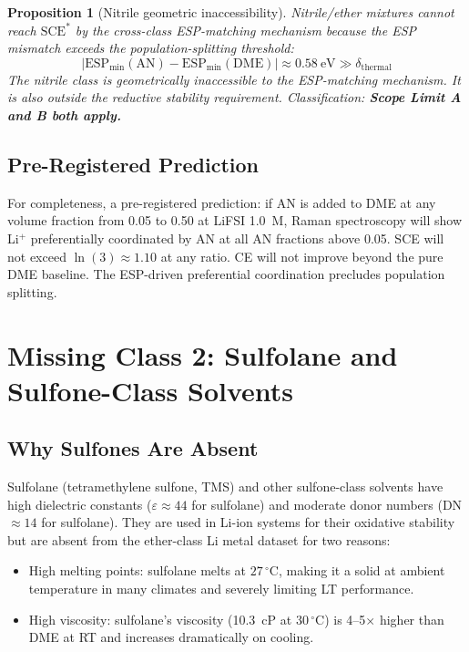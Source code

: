 \documentclass[11pt]{article}
\theoremstyle{plain}
\newtheorem{proposition}[theorem]{Proposition}
\theoremstyle{definition}
\theoremstyle{remark}
\begin{document}
\begin{proposition}[Nitrile geometric inaccessibility]
Nitrile/ether mixtures cannot reach $\mathrm{SCE}^{*}$ by the
cross-class ESP-matching mechanism because the ESP mismatch
exceeds the population-splitting threshold:
\begin{equation}
  |\mathrm{ESP}_{\min}(\mathrm{AN}) - \mathrm{ESP}_{\min}(\mathrm{DME})|
  \approx 0.58~\mathrm{eV} \gg \delta_{\mathrm{thermal}}
\end{equation}
The nitrile class is geometrically inaccessible to the
ESP-matching mechanism.  It is also outside the reductive
stability requirement.  Classification: \textbf{Scope Limit A
and B both apply.}
\end{proposition}

\subsection{Pre-Registered Prediction}

For completeness, a pre-registered prediction: if AN is added
to DME at any volume fraction from 0.05 to 0.50 at LiFSI 1.0~M,
Raman spectroscopy will show Li$^+$ preferentially coordinated
by AN at all AN fractions above 0.05.  SCE will not exceed
$\ln(3) \approx 1.10$ at any ratio.  CE will not improve
beyond the pure DME baseline.  The ESP-driven preferential
coordination precludes population splitting.

\section{Missing Class 2: Sulfolane and Sulfone-Class Solvents}
\label{sec:sulfone}

\subsection{Why Sulfones Are Absent}

Sulfolane (tetramethylene sulfone, TMS) and other sulfone-class
solvents have high dielectric constants ($\varepsilon \approx 44$
for sulfolane) and moderate donor numbers (DN $\approx 14$ for
sulfolane).  They are used in Li-ion systems for their
oxidative stability but are absent from the ether-class Li metal
dataset for two reasons:
\begin{itemize}[leftmargin=2em]
  \item High melting points: sulfolane melts at $27\,^\circ$C,
        making it a solid at ambient temperature in many climates
        and severely limiting LT performance.
  \item High viscosity: sulfolane's viscosity (10.3~cP at
        30\,$^\circ$C) is 4--5$\times$ higher than DME at
        RT and increases dramatically on cooling.
\end{itemize}
\end{document}
